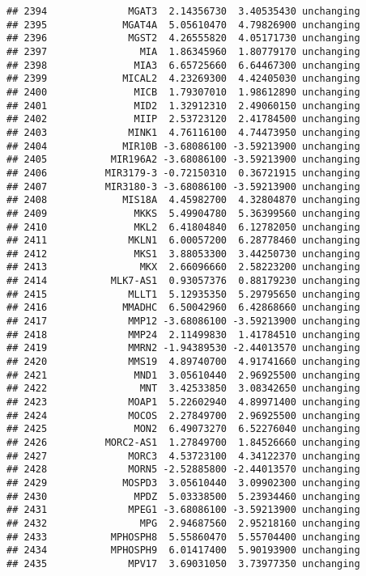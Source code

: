 \documentclass[]{article}
\begin{document}
\begin{verbatim}
## 2394              MGAT3  2.14356730  3.40535430 unchanging
## 2395             MGAT4A  5.05610470  4.79826900 unchanging
## 2396              MGST2  4.26555820  4.05171730 unchanging
## 2397                MIA  1.86345960  1.80779170 unchanging
## 2398               MIA3  6.65725660  6.64467300 unchanging
## 2399             MICAL2  4.23269300  4.42405030 unchanging
## 2400               MICB  1.79307010  1.98612890 unchanging
## 2401               MID2  1.32912310  2.49060150 unchanging
## 2402               MIIP  2.53723120  2.41784500 unchanging
## 2403              MINK1  4.76116100  4.74473950 unchanging
## 2404             MIR10B -3.68086100 -3.59213900 unchanging
## 2405           MIR196A2 -3.68086100 -3.59213900 unchanging
## 2406          MIR3179-3 -0.72150310  0.36721915 unchanging
## 2407          MIR3180-3 -3.68086100 -3.59213900 unchanging
## 2408             MIS18A  4.45982700  4.32804870 unchanging
## 2409               MKKS  5.49904780  5.36399560 unchanging
## 2410               MKL2  6.41804840  6.12782050 unchanging
## 2411              MKLN1  6.00057200  6.28778460 unchanging
## 2412               MKS1  3.88053300  3.44250730 unchanging
## 2413                MKX  2.66096660  2.58223200 unchanging
## 2414           MLK7-AS1  0.93057376  0.88179230 unchanging
## 2415              MLLT1  5.12935350  5.29795650 unchanging
## 2416             MMADHC  6.50042960  6.42868660 unchanging
## 2417              MMP12 -3.68086100 -3.59213900 unchanging
## 2418              MMP24  2.11499830  1.41784510 unchanging
## 2419              MMRN2 -1.94389530 -2.44013570 unchanging
## 2420              MMS19  4.89740700  4.91741660 unchanging
## 2421               MND1  3.05610440  2.96925500 unchanging
## 2422                MNT  3.42533850  3.08342650 unchanging
## 2423              MOAP1  5.22602940  4.89971400 unchanging
## 2424              MOCOS  2.27849700  2.96925500 unchanging
## 2425               MON2  6.49073270  6.52276040 unchanging
## 2426          MORC2-AS1  1.27849700  1.84526660 unchanging
## 2427              MORC3  4.53723100  4.34122370 unchanging
## 2428              MORN5 -2.52885800 -2.44013570 unchanging
## 2429             MOSPD3  3.05610440  3.09902300 unchanging
## 2430               MPDZ  5.03338500  5.23934460 unchanging
## 2431              MPEG1 -3.68086100 -3.59213900 unchanging
## 2432                MPG  2.94687560  2.95218160 unchanging
## 2433           MPHOSPH8  5.55860470  5.55704400 unchanging
## 2434           MPHOSPH9  6.01417400  5.90193900 unchanging
## 2435              MPV17  3.69031050  3.73977350 unchanging

\end{verbatim}
\end{document}
